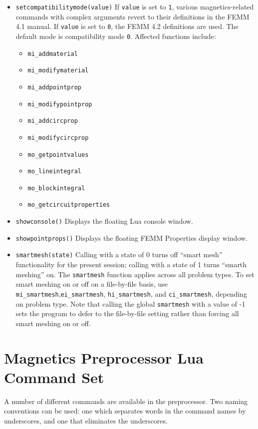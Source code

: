 \begin{itemize}
\item {\tt setcompatibilitymode(value)} If {\tt value} is set to {\tt 1}, various magnetics-related
commands with complex arguments revert to their definitions in the FEMM 4.1 manual.  If {\tt value} is
set to {\tt 0}, the FEMM 4.2 definitions are used.  The default mode is compatibility mode {\tt 0}. Affected functions include:
\begin{itemize}
\item {\tt mi\_addmaterial}
\item {\tt mi\_modifymaterial}
\item {\tt mi\_addpointprop}
\item {\tt mi\_modifypointprop}
\item {\tt mi\_addcircprop}
\item {\tt mi\_modifycircprop}
\item {\tt mo\_getpointvalues}
\item {\tt mo\_lineintegral}
\item {\tt mo\_blockintegral}
\item {\tt mo\_getcircuitproperties}
\end{itemize}

\item{\tt showconsole()} Displays the floating Lua console window.

\item{\tt showpointprops()} Displays the floating FEMM Properties
display window.

\item{\tt smartmesh(state)} Calling with a state of 0 turns off ``smart mesh'' functionality for the present session; calling with a state of 1 turns ``smarth meshing'' on. The {\tt smartmesh} function applies across all problem types. 
To set smart meshing on or off on a file-by-file basis, use  \verb+mi_smartmesh+,\verb+ei_smartmesh+, \verb+hi_smartmesh+, and \verb+ci_smartmesh+, depending on problem type.  Note that calling the global \verb+smartmesh+ with a value of -1 sets the program to defer to the file-by-file setting rather than forcing all smart meshing on or off.
\end{itemize}


\section{Magnetics Preprocessor Lua Command Set}

A number of different commands are available in the preprocessor.
Two naming conventions can be used: one which separates words in
the command names by underscores, and one that eliminates the
underscores.

